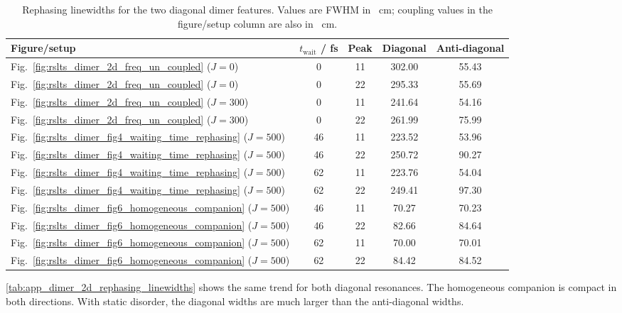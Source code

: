 \begin{table}[htbp]
    \centering
    \scriptsize
    \caption{Rephasing linewidths for the two diagonal dimer features. Values
    are FWHM in \si{\per\centi\metre}; coupling values in the figure/setup
    column are also in \si{\per\centi\metre}.}
    \label{tab:app_dimer_2d_rephasing_linewidths}
    \begin{tabular}{@{}lcccc@{}}
        \toprule
        Figure/setup & $t_{\mathrm{wait}}$ / fs & Peak & Diagonal & Anti-diagonal \\
        \midrule
        Fig.~\ref{fig:rslts_dimer_2d_freq_un_coupled} ($J=0$)   & 0  & 11 & 302.00 & 55.43 \\
        Fig.~\ref{fig:rslts_dimer_2d_freq_un_coupled} ($J=0$)   & 0  & 22 & 295.33 & 55.69 \\
        Fig.~\ref{fig:rslts_dimer_2d_freq_un_coupled} ($J=300$) & 0  & 11 & 241.64 & 54.16 \\
        Fig.~\ref{fig:rslts_dimer_2d_freq_un_coupled} ($J=300$) & 0  & 22 & 261.99 & 75.99 \\
        Fig.~\ref{fig:rslts_dimer_fig4_waiting_time_rephasing} ($J=500$) & 46 & 11 & 223.52 & 53.96 \\
        Fig.~\ref{fig:rslts_dimer_fig4_waiting_time_rephasing} ($J=500$) & 46 & 22 & 250.72 & 90.27 \\
        Fig.~\ref{fig:rslts_dimer_fig4_waiting_time_rephasing} ($J=500$) & 62 & 11 & 223.76 & 54.04 \\
        Fig.~\ref{fig:rslts_dimer_fig4_waiting_time_rephasing} ($J=500$) & 62 & 22 & 249.41 & 97.30 \\
        Fig.~\ref{fig:rslts_dimer_fig6_homogeneous_companion} ($J=500$)  & 46 & 11 & 70.27  & 70.23 \\
        Fig.~\ref{fig:rslts_dimer_fig6_homogeneous_companion} ($J=500$)  & 46 & 22 & 82.66  & 84.64 \\
        Fig.~\ref{fig:rslts_dimer_fig6_homogeneous_companion} ($J=500$)  & 62 & 11 & 70.00  & 70.01 \\
        Fig.~\ref{fig:rslts_dimer_fig6_homogeneous_companion} ($J=500$)  & 62 & 22 & 84.42  & 84.52 \\
        \bottomrule
    \end{tabular}
\end{table}

\autoref{tab:app_dimer_2d_rephasing_linewidths} shows the same trend for both
diagonal resonances. The homogeneous companion is compact in both directions.
With static disorder, the diagonal widths are much larger than the
anti-diagonal widths.

